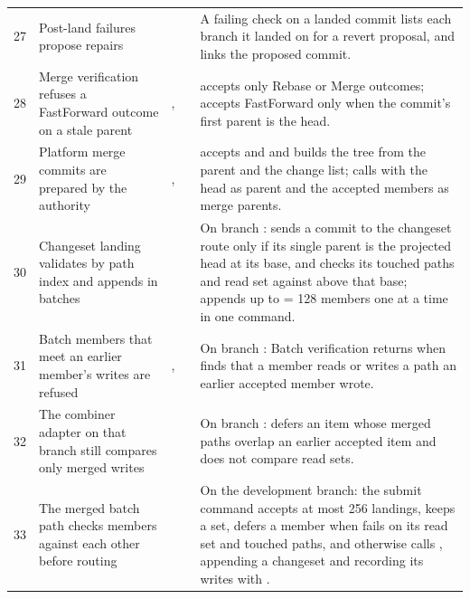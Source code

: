 \documentclass[11pt,letterpaper]{article}
\theoremstyle{definition}
\theoremstyle{remark}
\begin{document}
\begin{small}
\begin{longtable}{@{}L{0.7cm}L{3.1cm}L{3.8cm}L{1.5cm}L{4.9cm}@{}}
27 & Post-land failures propose repairs &  &  & A failing check on a landed commit lists each branch it landed on for a revert proposal, and  links the proposed commit. \\
28 & Merge verification refuses a FastForward outcome on a stale parent & ,  &  &  accepts only Rebase or Merge outcomes;  accepts FastForward only when the commit's first parent is the head. \\
29 & Platform merge commits are prepared by the authority & ,  &  &  accepts  and  and builds the tree from the parent and the change list;  calls  with the head as parent and the accepted members as merge parents. \\
30 & Changeset landing validates by path index and appends in batches &  &  & On branch :  sends a commit to the changeset route only if its single parent is the projected head at its base, and checks its touched paths and read set against  above that base;  appends up to  = 128 members one at a time in one command. \\
31 & Batch members that meet an earlier member's writes are refused & ,  &  & On branch : Batch verification returns  when  finds that a member reads or writes a path an earlier accepted member wrote. \\
32 & The combiner adapter on that branch still compares only merged writes &  &  & On branch :  defers an item whose merged paths overlap an earlier accepted item and does not compare read sets. \\
33 & The merged batch path checks members against each other before routing &  &  & On the development branch: the submit command accepts at most 256 landings, keeps a  set, defers a member when  fails on its read set and touched paths, and otherwise calls , appending a changeset and recording its writes with . \\
\end{longtable}
\end{small}
\end{document}
